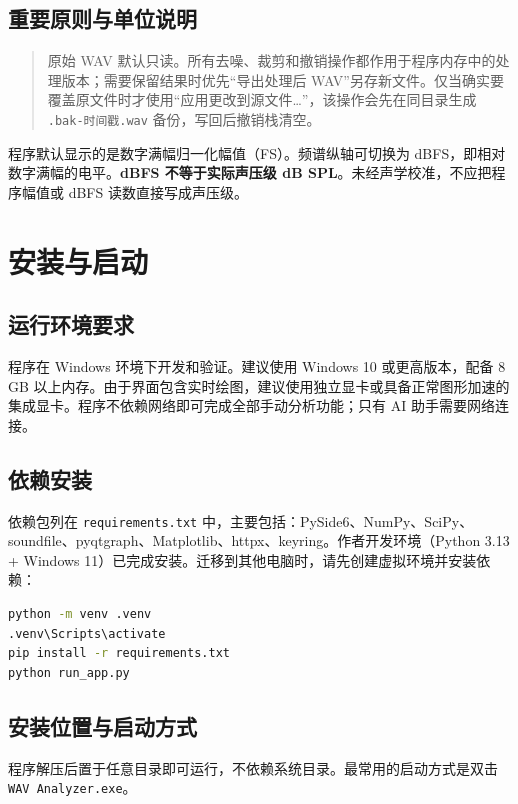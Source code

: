 \documentclass[UTF8,a4paper,12pt,scheme=chinese]{ctexart}
\begin{document}
\subsection{重要原则与单位说明}

\begin{quote}
原始 WAV 默认只读。所有去噪、裁剪和撤销操作都作用于程序内存中的处理版本；需要保留结果时优先“导出处理后 WAV”另存新文件。仅当确实要覆盖原文件时才使用“应用更改到源文件…”，该操作会先在同目录生成 \texttt{.bak-时间戳.wav} 备份，写回后撤销栈清空。
\end{quote}

程序默认显示的是数字满幅归一化幅值（FS）。频谱纵轴可切换为 dBFS，即相对数字满幅的电平。\textbf{dBFS 不等于实际声压级 dB SPL}。未经声学校准，不应把程序幅值或 dBFS 读数直接写成声压级。

\section{安装与启动}

\subsection{运行环境要求}

程序在 Windows 环境下开发和验证。建议使用 Windows 10 或更高版本，配备 8 GB 以上内存。由于界面包含实时绘图，建议使用独立显卡或具备正常图形加速的集成显卡。程序不依赖网络即可完成全部手动分析功能；只有 AI 助手需要网络连接。

\subsection{依赖安装}

依赖包列在 \texttt{requirements.txt} 中，主要包括：PySide6、NumPy、SciPy、soundfile、pyqtgraph、Matplotlib、httpx、keyring。作者开发环境（Python 3.13 + Windows 11）已完成安装。迁移到其他电脑时，请先创建虚拟环境并安装依赖：

\begin{lstlisting}[language=bash]
python -m venv .venv
.venv\Scripts\activate
pip install -r requirements.txt
python run_app.py
\end{lstlisting}

\subsection{安装位置与启动方式}

程序解压后置于任意目录即可运行，不依赖系统目录。最常用的启动方式是双击 \texttt{WAV Analyzer.exe}。
\end{document}
